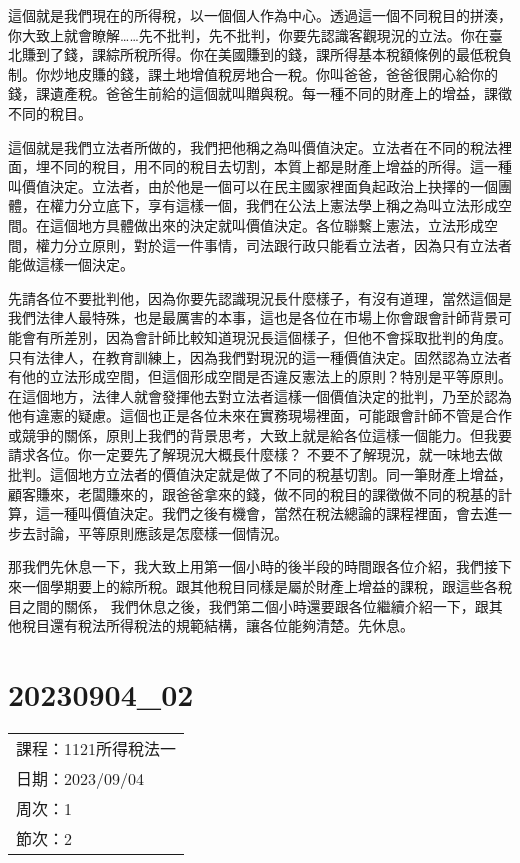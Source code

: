 \documentclass[]{ctexbook}
\begin{document}
這個就是我們現在的所得稅，以一個個人作為中心。透過這一個不同稅目的拼湊，你大致上就會瞭解\ldots\ldots 先不批判，先不批判，你要先認識客觀現況的立法。你在臺北賺到了錢，課綜所稅所得。你在美國賺到的錢，課所得基本稅額條例的最低稅負制。你炒地皮賺的錢，課土地增值稅房地合一稅。你叫爸爸，爸爸很開心給你的錢，課遺產稅。爸爸生前給的這個就叫贈與稅。每一種不同的財產上的增益，課徵不同的稅目。

這個就是我們立法者所做的，我們把他稱之為叫價值決定。立法者在不同的稅法裡面，埋不同的稅目，用不同的稅目去切割，本質上都是財產上增益的所得。這一種叫價值決定。立法者，由於他是一個可以在民主國家裡面負起政治上抉擇的一個團體，在權力分立底下，享有這樣一個，我們在公法上憲法學上稱之為叫立法形成空間。在這個地方具體做出來的決定就叫價值決定。各位聯繫上憲法，立法形成空間，權力分立原則，對於這一件事情，司法跟行政只能看立法者，因為只有立法者能做這樣一個決定。

先請各位不要批判他，因為你要先認識現況長什麼樣子，有沒有道理，當然這個是我們法律人最特殊，也是最厲害的本事，這也是各位在市場上你會跟會計師背景可能會有所差別，因為會計師比較知道現況長這個樣子，但他不會採取批判的角度。只有法律人，在教育訓練上，因為我們對現況的這一種價值決定。固然認為立法者有他的立法形成空間，但這個形成空間是否違反憲法上的原則？特別是平等原則。在這個地方，法律人就會發揮他去對立法者這樣一個價值決定的批判，乃至於認為他有違憲的疑慮。這個也正是各位未來在實務現場裡面，可能跟會計師不管是合作或競爭的關係，原則上我們的背景思考，大致上就是給各位這樣一個能力。但我要請求各位。你一定要先了解現況大概長什麼樣？ 不要不了解現況，就一味地去做批判。這個地方立法者的價值決定就是做了不同的稅基切割。同一筆財產上增益，顧客賺來，老闆賺來的，跟爸爸拿來的錢，做不同的稅目的課徵做不同的稅基的計算，這一種叫價值決定。我們之後有機會，當然在稅法總論的課程裡面，會去進一步去討論，平等原則應該是怎麼樣一個情況。

那我們先休息一下，我大致上用第一個小時的後半段的時間跟各位介紹，我們接下來一個學期要上的綜所稅。跟其他稅目同樣是屬於財產上增益的課稅，跟這些各稅目之間的關係，
我們休息之後，我們第二個小時還要跟各位繼續介紹一下，跟其他稅目還有稅法所得稅法的規範結構，讓各位能夠清楚。先休息。

\hypertarget{section-1}{%
\chapter{20230904\_02}\label{section-1}}

\begin{longtable}[]{@{}l@{}}
\toprule()
\endhead
課程：1121所得稅法一 \\
日期：2023/09/04 \\
周次：1 \\
節次：2 \\
\bottomrule()
\end{longtable}
\end{document}
